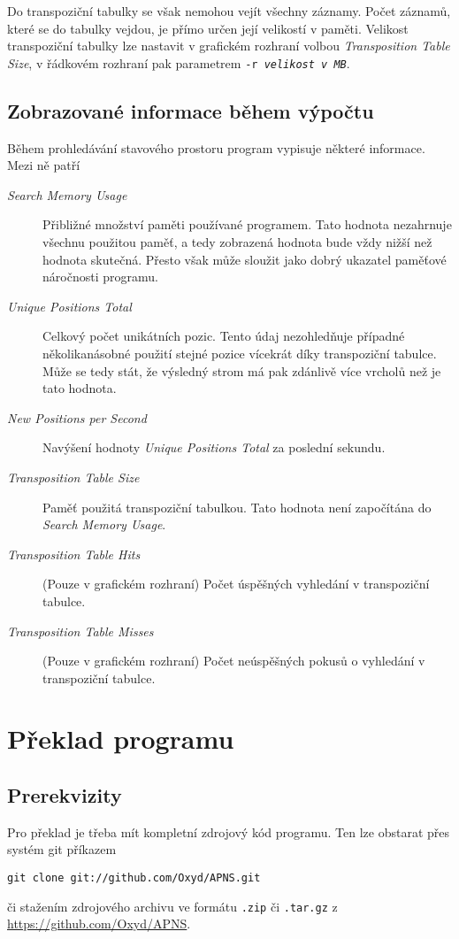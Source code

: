 \documentclass{article}
\begin{document}
Do transpoziční tabulky se však nemohou vejít všechny záznamy. Počet záznamů, které se do tabulky vejdou, je přímo určen
její velikostí v paměti. Velikost transpoziční tabulky lze nastavit v grafickém rozhraní volbou \emph{Transposition
Table Size}, v řádkovém rozhraní pak parametrem \texttt{-r \textit{velikost v MB}}.

\subsection{Zobrazované informace během výpočtu}
Během prohledávání stavového prostoru program vypisuje některé informace. Mezi ně patří \begin{description}
\item[\emph{Search Memory Usage}] Přibližné množství paměti používané programem. Tato hodnota nezahrnuje všech\-nu
použitou paměť, a tedy zobrazená hodnota bude vždy nižší než hodnota skutečná. Přesto však může sloužit jako dobrý
ukazatel paměťové náročnosti programu.
\item[\emph{Unique Positions Total}] Celkový počet unikátních pozic. Tento údaj nezohledňuje případné několikanásobné
použití stejné pozice vícekrát díky transpoziční tabulce. Může se tedy stát, že výsledný strom má pak zdánlivě více
vrcholů než je tato hodnota.
\item[\emph{New Positions per Second}] Navýšení hodnoty \emph{Unique Positions Total} za poslední sekundu.
\item[\emph{Transposition Table Size}] Paměť použitá transpoziční tabulkou. Tato hodnota není započítána do \emph{Search
Memory Usage}.
\item[\emph{Transposition Table Hits}] (Pouze v grafickém rozhraní) Počet úspěšných vyhledání v transpoziční tabulce.
\item[\emph{Transposition Table Misses}] (Pouze v grafickém rozhraní) Počet neúspěšných pokusů o vyhledání v
transpoziční tabulce.
\end{description}

\section{Překlad programu}
\label{sec:compiling}

\subsection{Prerekvizity}
Pro překlad je třeba mít kompletní zdrojový kód programu. Ten lze obstarat přes systém git příkazem
\begin{center}\verb+git clone git://github.com/Oxyd/APNS.git+\end{center} či stažením zdrojového archivu ve formátu
\texttt{.zip} či \texttt{.tar.gz} z \url{https://github.com/Oxyd/APNS}.
\end{document}
